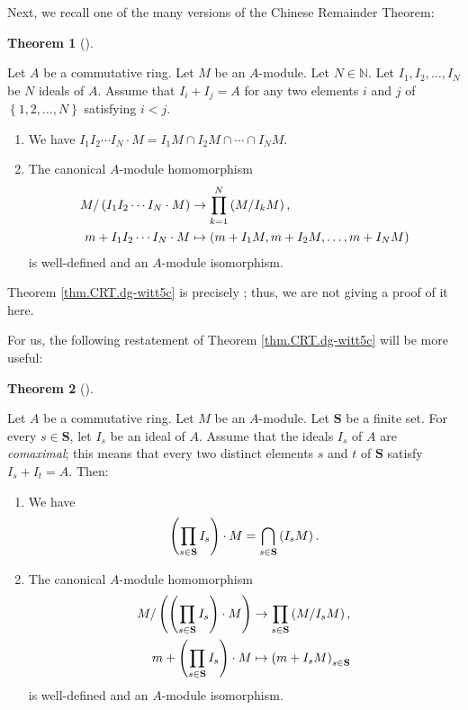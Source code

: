 \documentclass[numbers=enddot,12pt,final,onecolumn,notitlepage]{scrartcl}%
\theoremstyle{definition}
\newtheorem{theo}{Theorem}[section]
\newenvironment{theorem}[1][]
{\begin{theo}[#1]\begin{leftbar}}
{\end{leftbar}\end{theo}}
\let\prodnonlimits\prod
\renewcommand{\prod}{\prodnonlimits\limits}
\begin{document}
Next, we recall one of the many versions of the Chinese Remainder Theorem:

\begin{theorem}
\label{thm.CRT.dg-witt5c}Let $A$ be a commutative ring. Let $M$ be an
$A$-module. Let $N\in\mathbb{N}$. Let $I_{1},I_{2},\ldots,I_{N}$ be $N$ ideals
of $A$. Assume that $I_{i}+I_{j}=A$ for any two elements $i$ and $j$ of
$\left\{  1,2,\ldots,N\right\}  $ satisfying $i<j$.

\begin{enumerate}
\item[\textbf{(a)}] We have $I_{1}I_{2}\cdots I_{N}\cdot M=I_{1}M\cap
I_{2}M\cap\cdots\cap I_{N}M$.

\item[\textbf{(b)}] The canonical $A$-module homomorphism
\begin{align*}
M/\left(  I_{1}I_{2}\cdots I_{N}\cdot M\right)   &  \rightarrow\prod
\limits_{k=1}^{N}\left(  M/I_{k}M\right)  ,\\
m+I_{1}I_{2}\cdots I_{N}\cdot M  &  \mapsto\left(  m+I_{1}M,m+I_{2}%
M,\ldots,m+I_{N}M\right)
\end{align*}
is well-defined and an $A$-module isomorphism.
\end{enumerate}
\end{theorem}

Theorem \ref{thm.CRT.dg-witt5c} is precisely \cite[Theorem 1 \textbf{(a)} and
\textbf{(b)}]{dg-witt5c}; thus, we are not giving a proof of it here.

For us, the following restatement of Theorem \ref{thm.CRT.dg-witt5c} will be
more useful:

\begin{theorem}
\label{thm.CRT}Let $A$ be a commutative ring. Let $M$ be an $A$-module. Let
$\mathbf{S}$ be a finite set. For every $s\in\mathbf{S}$, let $I_{s}$ be an
ideal of $A$. Assume that the ideals $I_{s}$ of $A$ are \textit{comaximal};
this means that every two distinct elements $s$ and $t$ of $\mathbf{S}$
satisfy $I_{s}+I_{t}=A$. Then:

\begin{enumerate}
\item[\textbf{(a)}] We have
\[
\left(  \prod\limits_{s\in\mathbf{S}}I_{s}\right)  \cdot M=\bigcap
_{s\in\mathbf{S}}\left(  I_{s}M\right)  .
\]


\item[\textbf{(b)}] The canonical $A$-module homomorphism
\begin{align*}
M/\left(  \left(  \prod\limits_{s\in\mathbf{S}}I_{s}\right)  \cdot M\right)
&  \rightarrow\prod\limits_{s\in\mathbf{S}}\left(  M/I_{s}M\right)  ,\\
m+\left(  \prod\limits_{s\in\mathbf{S}}I_{s}\right)  \cdot M  &
\mapsto\left(  m+I_{s}M\right)  _{s\in\mathbf{S}}%
\end{align*}
is well-defined and an $A$-module isomorphism.
\end{enumerate}
\end{theorem}
\end{document}
